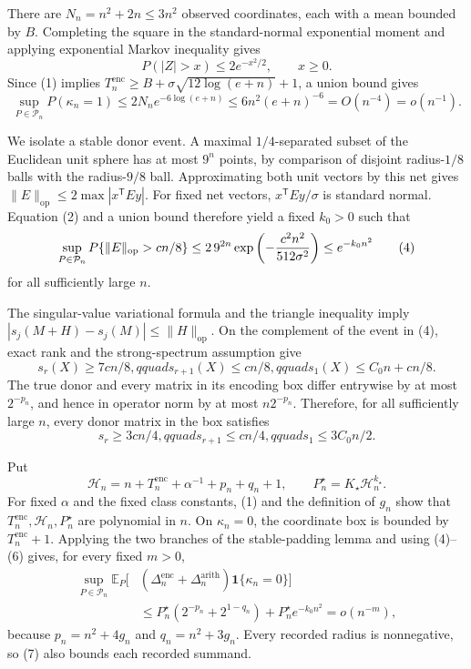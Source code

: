 There are \(N_n=n^2+2n\le3n^2\) observed coordinates, each with a mean bounded
by \(B\).  Completing the square in the standard-normal exponential moment and
applying exponential Markov inequality gives
\[
P(|Z|>x)\le2e^{-x^2/2},\qquad x\ge0.                                  \tag{2}
\]
Since (1) implies
\(T_n^{\mathrm{enc}}\ge B+\sigma\sqrt{12\log(e+n)}+1\), a union bound gives
\[
\sup_{P\in\mathcal P_n}P(\kappa_n=1)
\le2N_ne^{-6\log(e+n)}
\le6n^2(e+n)^{-6}=O(n^{-4})=o(n^{-1}).                                \tag{3}
\]

We isolate a stable donor event.  A maximal \(1/4\)-separated subset of the
Euclidean unit sphere has at most \(9^n\) points, by comparison of disjoint
radius-\(1/8\) balls with the radius-\(9/8\) ball.  Approximating both unit
vectors by this net gives
\(\|E\|_{
\mathrm{op}}\le2\max|x^{\mathsf T}Ey|\).  For fixed net vectors,
\(x^{\mathsf T}Ey/\sigma\) is standard normal.  Equation (2) and a union bound
therefore yield a fixed \(k_0>0\) such that
\[
\sup_{P\in\mathcal P_n}
P\{\|E\|_{
\mathrm{op}}>cn/8\}
\le2\,9^{2n}\exp\left(-{c^2n^2\over512\sigma^2}\right)
\le e^{-k_0n^2}                                                       \tag{4}
\]
for all sufficiently large \(n\).

The singular-value variational formula and the triangle inequality imply
\(|s_j(M+H)-s_j(M)|\le\|H\|_{
\mathrm{op}}\).  On the complement of the event in (4), exact rank and the
strong-spectrum assumption give
\[
s_r(X)\ge7cn/8,qquad s_{r+1}(X)\le cn/8,qquad
s_1(X)\le C_0n+cn/8.                                                  \tag{5}
\]
The true donor and every matrix in its encoding box differ entrywise by at most
\(2^{-p_n}\), and hence in operator norm by at most \(n2^{-p_n}\).  Therefore,
for all sufficiently large \(n\), every donor matrix in the box satisfies
\[
s_r\ge3cn/4,qquad s_{r+1}\le cn/4,qquad s_1\le3C_0n/2.              \tag{6}
\]

Put
\[
\mathcal H_n=n+T_n^{\mathrm{enc}}+\alpha^{-1}+p_n+q_n+1,
\qquad P_n^\star=K_\star\mathcal H_n^{k_\star}.
\]
For fixed \(\alpha\) and the fixed class constants, (1) and the definition of
\(g_n\) show that \(T_n^{\mathrm{enc}},\mathcal H_n,P_n^\star\) are polynomial
in \(n\).  On \(\kappa_n=0\), the coordinate box is bounded by
\(T_n^{\mathrm{enc}}+1\).  Applying the two branches of the stable-padding lemma
and using (4)--(6) gives, for every fixed \(m>0\),
\[
\begin{aligned}
\sup_{P\in\mathcal P_n}\mathbb E_P[&
(\Delta_n^{\mathrm{enc}}+\Delta_n^{\mathrm{arith}})
\mathbf1\{\kappa_n=0\}]\\
&\le P_n^\star(2^{-p_n}+2^{1-q_n})+P_n^\star e^{-k_0n^2}
=o(n^{-m}),
\end{aligned}                                                        \tag{7}
\]
because \(p_n=n^2+4g_n\) and \(q_n=n^2+3g_n\).  Every recorded radius is
nonnegative, so (7) also bounds each recorded summand.


